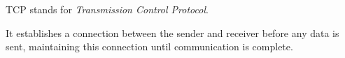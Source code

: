 TCP stands for \emph{Transmission Control Protocol}.

It establishes a connection between the sender and receiver before any data is sent, maintaining this connection until communication is complete.
